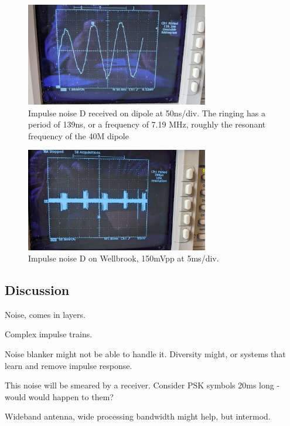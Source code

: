 \documentclass{article}
\begin{document}
\begin{figure}[h]
\caption{Impulse noise D received on dipole at 50ns/div.  The ringing has a period of 139ns, or a frequency of 7.19 MHz, roughly the resonant frequency of the 40M dipole}
\label{fig:D_dipole_50ns}
\begin{center}
\includegraphics[width=8cm]{D_dipole_50ns.jpg}
\end{center}
\end{figure}

\begin{figure}[h]
\caption{Impulse noise D on Wellbrook, 150mVpp at 5ms/div.}
\label{fig:D_wellbrook_5ms}
\begin{center}
\includegraphics[width=8cm]{D_wellbrook_5ms.jpg}
\end{center}
\end{figure}

\subsection{Discussion}

Noise, comes in layers.

Complex impulse trains.

Noise blanker might not be able to handle it.  Diversity might, or systems that learn and remove impulse response.

This noise will be smeared by a receiver.  Consider PSK symbols 20ms long - would would happen to them?

Wideband antenna, wide processing bandwidth might help, but intermod.



\end{document}
